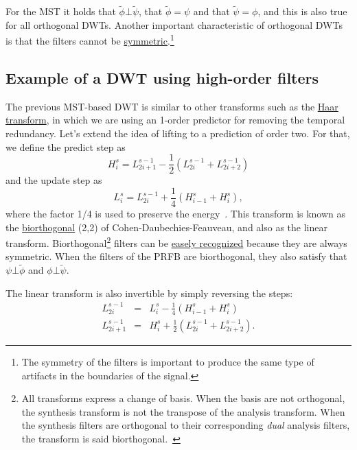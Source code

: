 For the MST it holds that $\tilde\phi\bot\tilde\psi$, that
$\tilde\phi=\psi$ and that $\tilde\psi=\phi$, and this is also true
for all orthogonal DWTs. Another important characteristic of
orthogonal DWTs is that the filters cannot be
\href{https://en.wikipedia.org/wiki/Symmetry}{symmetric}.\footnote{The
  symmetry of the filters is important to produce the same type of
  artifacts in the boundaries of the signal.}


\subsection{Example of a DWT using high-order filters}
The previous MST-based DWT is similar to other transforms such as the
\href{https://en.wikipedia.org/wiki/Haar_wavelet}{Haar transform}, in
which we are using an 1-order predictor for removing the temporal
redundancy. Let's extend the idea of lifting to a prediction of order
two. For that, we define the predict step as
\begin{equation}
  H^s_i = L^{s-1}_{2i+1} - \frac{1}{2}(L^{s-1}_{2i} + L^{s-1}_{2i+2})
\end{equation}
and the update step as
\begin{equation}
  L^s_i = L^{s-1}_{2i} + \frac{1}{4}(H^s_{i-1} + H^s_i),
\end{equation}
where the factor 1/4 is used to preserve the
energy~\cite{sweldens1997building}. This transform is known as the
\href{https://en.wikipedia.org/wiki/Biorthogonal_wavelet}{biorthogonal}
(2,2) of Cohen-Daubechies-Feauveau, and also as the linear transform.
Biorthogonal\footnote{All transforms express a change of basis. When
  the basis are not orthogonal, the synthesis transform is not the
  transpose of the analysis transform. When the synthesis filters are
  orthogonal to their corresponding \emph{dual} analysis filters, the
  transform is said biorthogonal.~\cite{vetterli2014foundations}}
filters can be \href{http://wavelets.pybytes.com/}{easely recognized}
because they are always symmetric. When the filters of the PRFB are
biorthogonal, they also satisfy that $\psi\bot\tilde\phi$ and
$\phi\bot\tilde\psi$.

The linear transform is also invertible by simply reversing the steps:
\begin{equation}
  \begin{array}{rcl}
    L^{s-1}_{2i} & = & L^s_i - \frac{1}{4}(H^s_{i-1} + H^s_i)\\
    L^{s-1}_{2i+1} & = & H^s_i + \frac{1}{2}(L^{s-1}_{2i} + L^{s-1}_{2i+2}).
  \end{array}
\end{equation}
  

